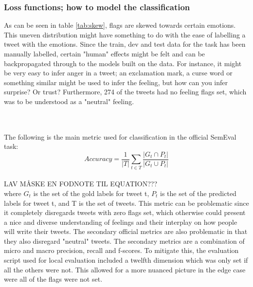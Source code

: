 \subsubsection{Loss functions; how to model the classification} \label{sec:lossdiscussion}
As can be seen in table \ref{tab:skew}, flags are skewed towards certain emotions. This uneven distribution might have something to do with the ease of labelling a tweet with the emotions. Since the train, dev and test data for the task has been manually labelled, certain "human" effects might be felt and can be backpropagated through to the models built on the data. For instance, it might be very easy to infer anger in a tweet; an exclamation mark, a curse word or something similar might be used to infer the feeling, but how can you infer surprise? Or trust? Furthermore, 274 of the tweets had no feeling flags set, which was to be understood as a "neutral" feeling.\\
\begin{table}[h]
\caption{The actual flags set and percentage of the full classification dataset}
\label{tab:skew}
\end{table}\\
\\
The following is the main metric used for classification in the official SemEval task:\\
\begin{equation} \label{eq:accuracy}
Accuracy = \dfrac{1}{\lvert T \rvert} \sum_{t\in T}\dfrac{\lvert G_{t} \cap P_{t}\rvert}{\lvert G_{t} \cup P_{t}\rvert}
\end{equation}\\
LAV MÅSKE EN FODNOTE TIL EQUATION???\\
where $G_{t}$ is the set of the gold labels for tweet t, $P_{t}$ is the set of the predicted labels for tweet t, and T is the set of tweets. This metric can be problematic since it completely disregards tweets with zero flags set, which otherwise could present a nice and diverse understanding of feelings and their interplay on how people will write their tweets. The secondary official metrics are also problematic in that they also disregard "neutral" tweets. The secondary metrics are a combination of micro and macro precision, recall and f-scores. To mitigate this, the evaluation script used for local evaluation included a twelfth dimension which was only set if all the others were not. This allowed for a more nuanced picture in the edge case were all of the flags were not set.

